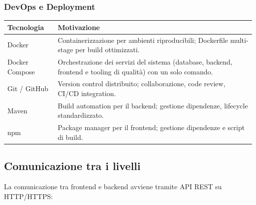 ﻿\documentclass[a4paper,11pt]{article}
\begin{document}
\subsubsection{DevOps e Deployment}

\begin{tabular}{|l|p{10cm}|}
\hline
\textbf{Tecnologia} & \textbf{Motivazione} \\
\hline
Docker & Containerizzazione per ambienti riproducibili; Dockerfile multi-stage per build ottimizzati. \\
\hline
Docker Compose & Orchestrazione dei servizi del sistema (database, backend, frontend e tooling di qualit\`a) con un solo comando. \\
\hline
Git / GitHub & Version control distribuito; collaborazione, code review, CI/CD integration. \\
\hline
Maven & Build automation per il backend; gestione dipendenze, lifecycle standardizzato. \\
\hline
npm & Package manager per il frontend; gestione dipendenze e script di build. \\
\hline
\end{tabular}

\subsection{Comunicazione tra i livelli}

La comunicazione tra frontend e backend avviene tramite API REST su HTTP/HTTPS:
\end{document}
